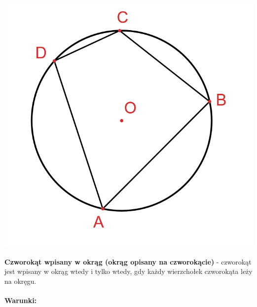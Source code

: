 \documentclass[14pt,a4paper]{extarticle}
\begin{document}
\begin{center}\includegraphics[scale=0.5]{geometria/czworokąt wpisany w okrąg.png}\end{center}
\noindent \textbf{Czworokąt wpisany w okrąg (okrąg opisany na czworokącie)} - czworokąt jest wpisany
w okrąg wtedy i tylko wtedy, gdy każdy wierzchołek czworokąta leży na okręgu.\\\\
\noindent \textbf{Warunki:}
\MoveBelowBox\unskip
{}
\end{document}
